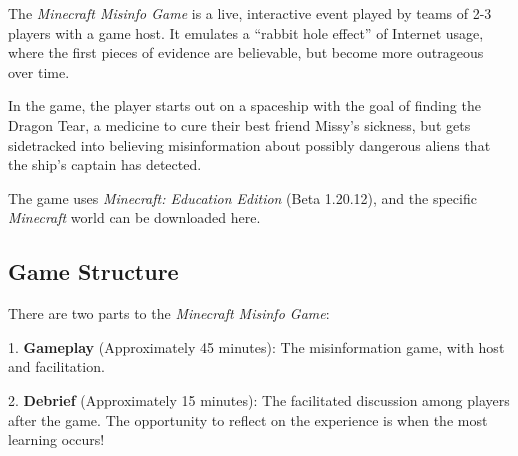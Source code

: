 The \textit{Minecraft Misinfo Game} is a live, interactive event played by teams of 2-3 players with a game host.  It emulates a “rabbit hole effect” of Internet usage, where the first pieces of evidence are believable, but become more outrageous over time.

In the game, the player starts out on a spaceship with the goal of finding the Dragon Tear, a medicine to cure their best friend Missy’s sickness, but gets sidetracked into believing misinformation about possibly dangerous aliens that the ship’s captain has detected.

The game uses \textit{Minecraft: Education Edition} (Beta 1.20.12), and the specific \textit{Minecraft} world can be downloaded here. 

\subsection{Game Structure}
There are two parts to the \textit{Minecraft Misinfo Game}:

1.	\textbf{Gameplay }(Approximately 45 minutes): The misinformation game, with host and facilitation. 

2.	\textbf{Debrief} (Approximately 15 minutes): The facilitated discussion among players after the game. The opportunity to reflect on the experience is when the most learning occurs!
